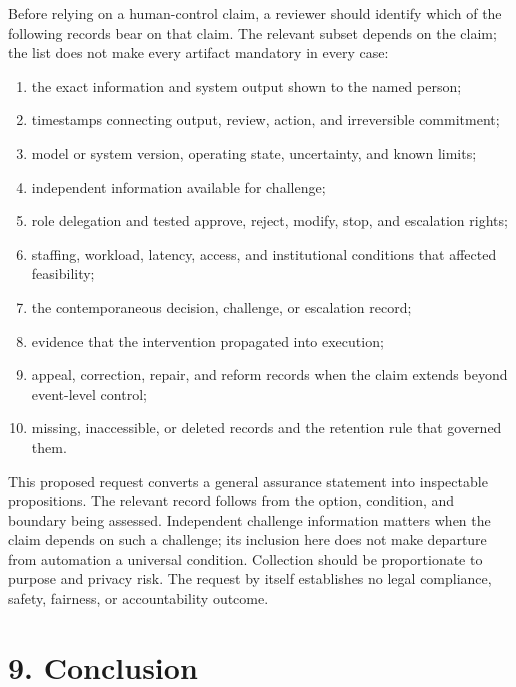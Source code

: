 \documentclass[11pt]{article}
\begin{document}
Before relying on a human-control claim, a reviewer should identify which of the following records bear on that claim. The relevant subset depends on the claim; the list does not make every artifact mandatory in every case:

\begin{enumerate}[leftmargin=1.6em,itemsep=0.3em]
\item the exact information and system output shown to the named person;
\item timestamps connecting output, review, action, and irreversible commitment;
\item model or system version, operating state, uncertainty, and known limits;
\item independent information available for challenge;
\item role delegation and tested approve, reject, modify, stop, and escalation rights;
\item staffing, workload, latency, access, and institutional conditions that affected feasibility;
\item the contemporaneous decision, challenge, or escalation record;
\item evidence that the intervention propagated into execution;
\item appeal, correction, repair, and reform records when the claim extends beyond event-level control;
\item missing, inaccessible, or deleted records and the retention rule that governed them.
\end{enumerate}

This proposed request converts a general assurance statement into inspectable propositions. The relevant record follows from the option, condition, and boundary being assessed. Independent challenge information matters when the claim depends on such a challenge; its inclusion here does not make departure from automation a universal condition. Collection should be proportionate to purpose and privacy risk. The request by itself establishes no legal compliance, safety, fairness, or accountability outcome.

\section*{9. Conclusion}
\end{document}
